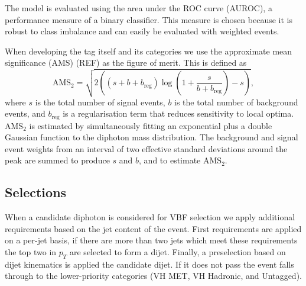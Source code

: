 The model is evaluated using the area under the ROC curve (AUROC), a performance measure of a binary classifier. 
This measure is chosen because it is robust to class imbalance and can easily be evaluated with weighted events.

When developing the tag itself and its categories we use the approximate mean significance (AMS) (REF) as the figure of merit. This is defined as
\begin{equation}
    \mathrm{AMS}_{2} = \sqrt{2\left( (s+b+b_{\mathrm{reg}})\log\left(1 + \frac{s}{b+b_{\mathrm{reg}}}\right) - s \right)},
\end{equation}
where $s$ is the total number of signal events, $b$ is the total number of background events, and $b_{\mathrm{reg}}$ is a regularisation term that reduces sensitivity to local optima. 
$\mathrm{AMS}_{2}$ is estimated by simultaneously fitting an exponential plus a double Gaussian function to the diphoton mass distribution. 
The background and signal event weights from an interval of two effective standard deviations around the peak are summed to produce $s$ and $b$, and to estimate $\mathrm{AMS}_{2}$. 







\subsection{Selections}
When a candidate diphoton is considered for VBF selection we apply additional requirements based on the jet content of the event. First requirements are applied on a per-jet basis, if there are more than two jets which meet these requirements the top two in $p_{T}$ are selected to form a dijet. Finally, a preselection based on dijet kinematics is applied the candidate dijet. If it does not pass the event falls through to the lower-priority categories (VH MET, VH Hadronic, and Untagged). 

